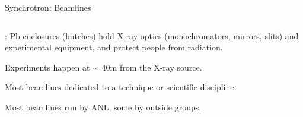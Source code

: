 \begin{slide}{Synchrotron: Beamlines }
\begin{columns}[T]
\begin{column}{75mm}
{         : Pb enclosures (hutches) hold X-ray
         optics (monochromators, mirrors, slits) and experimental equipment,
         and protect people from radiation.

         \vmm Experiments happen at $\sim$ 40m from the X-ray source.

         \vmm Most beamlines dedicated to a technique or scientific discipline.

         \vmm Most beamlines run by ANL, some by outside groups.

       }
     \end{column}
   \end{columns}


\end{slide}


